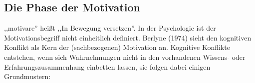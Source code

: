


\subsection{Die Phase der Motivation}
,,motivare'' hei{\ss}t ,,In Bewegung versetzen''.
In der Psychologie ist der Motivationsbegriff nicht einheitlich
definiert.
\bip
Berlyne (1974) sieht den kognitiven Konflikt als Kern der
(sachbezogenen) Motivation an.
Kognitive Konflikte entstehen, wenn sich Wahrnehmungen
nicht in den vorhandenen Wissens- oder Erfahrungszusammenhang
einbetten lassen, sie folgen dabei einigen Grundmustern:

